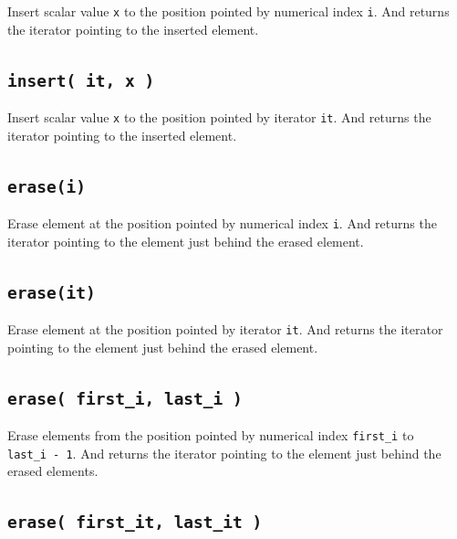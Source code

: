 \documentclass[]{book}
\begin{document}
Insert scalar value \texttt{x} to the position pointed by numerical index \texttt{i}. And returns the iterator pointing to the inserted element.

\hypertarget{insert-it-x}{%
\subsection{\texorpdfstring{\texttt{insert(\ it,\ x\ )}}{insert( it, x )}}\label{insert-it-x}}

Insert scalar value \texttt{x} to the position pointed by iterator \texttt{it}. And returns the iterator pointing to the inserted element.

\hypertarget{erasei}{%
\subsection{\texorpdfstring{\texttt{erase(i)}}{erase(i)}}\label{erasei}}

Erase element at the position pointed by numerical index \texttt{i}. And returns the iterator pointing to the element just behind the erased element.

\hypertarget{eraseit}{%
\subsection{\texorpdfstring{\texttt{erase(it)}}{erase(it)}}\label{eraseit}}

Erase element at the position pointed by iterator \texttt{it}. And returns the iterator pointing to the element just behind the erased element.

\hypertarget{erase-first_i-last_i}{%
\subsection{\texorpdfstring{\texttt{erase(\ first\_i,\ last\_i\ )}}{erase( first\_i, last\_i )}}\label{erase-first_i-last_i}}

Erase elements from the position pointed by numerical index \texttt{first\_i} to \texttt{last\_i\ -\ 1}. And returns the iterator pointing to the element just behind the erased elements.

\hypertarget{erase-first_it-last_it}{%
\subsection{\texorpdfstring{\texttt{erase(\ first\_it,\ last\_it\ )}}{erase( first\_it, last\_it )}}\label{erase-first_it-last_it}}
\end{document}
